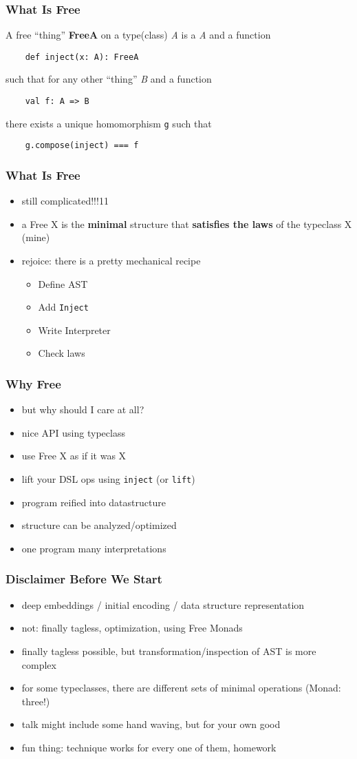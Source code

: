 \documentclass{beamer}
\newcommand{\recipe}{%
  \begin{itemize}
  \item Define AST
  \item Add \texttt{Inject}
  \item Write Interpreter
  \item Check laws
  \end{itemize}
}
\begin{document}
\begin{frame}[fragile]
  \frametitle{What Is Free} A free ``thing'' \textbf{FreeA} on a type(class)
  \textit{A} is a \textit{A} and a function
  \begin{verbatim}
    def inject(x: A): FreeA
  \end{verbatim}
  such that for any other ``thing'' \textit{B} and a function
  \begin{verbatim}
    val f: A => B
  \end{verbatim}
  there exists a unique homomorphism \texttt{g} such that
  \begin{verbatim}
    g.compose(inject) === f
  \end{verbatim}
\end{frame}

\begin{frame}[fragile]
  \frametitle{What Is Free}
  \begin{itemize}
  \item still complicated!!!11
  \item a Free X is the \textbf{minimal} structure that
    \textbf{satisfies the laws} of the typeclass X (mine)
  \item rejoice: there is a pretty mechanical recipe
    \recipe{}
  \end{itemize}
\end{frame}

\begin{frame}
  \frametitle{Why Free}
  \begin{itemize}
  \item but why should I care at all?
  \item nice API using typeclass
  \item use Free X as if it was X
  \item lift your DSL ops using \texttt{inject} (or \texttt{lift})
  \item program reified into datastructure
  \item structure can be analyzed/optimized
  \item one program \textemdash{} many interpretations
  \end{itemize}
\end{frame}

\begin{frame}
  \frametitle{Disclaimer Before We Start}
  \begin{itemize}
  \item deep embeddings / initial encoding / data structure representation
  \item not: finally tagless, optimization, using Free Monads
  \item finally tagless possible, but transformation/inspection of AST is more complex
  \item for some typeclasses, there are different sets of minimal operations (Monad: three!)
  \item talk might include some hand waving, but for your own good
  \item fun thing: technique works for every one of them, homework
  \end{itemize}
\end{frame}
\end{document}
